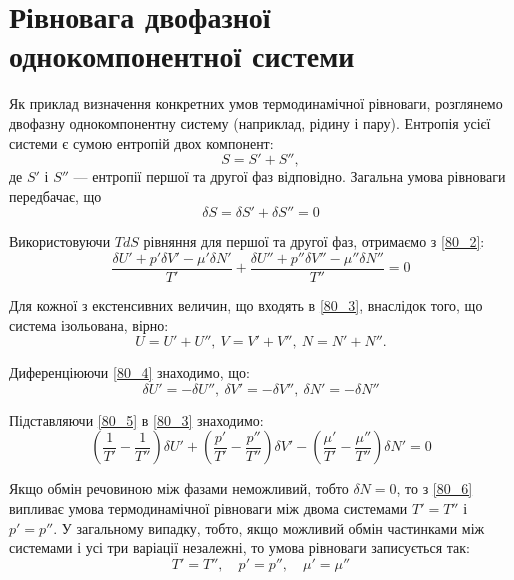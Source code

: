 \section{Рівновага двофазної однокомпонентної системи}

Як приклад визначення конкретних умов термодинамічної рівноваги, розглянемо двофазну однокомпонентну систему (наприклад, рідину і пару). Ентропія усієї системи є сумою ентропій двох компонент:
\begin{equation} \label{80_1}
S = S' + S'',
\end{equation}
%
де $S'$ і $S''$ --- ентропії першої та другої фаз відповідно. Загальна умова рівноваги передбачає, що
\begin{equation} \label{80_2}
\delta S = \delta S' + \delta S'' = 0
\end{equation}

Використовуючи $TdS$ рівняння для першої та другої фаз, отримаємо з \eqref{80_2}:
\begin{equation} \label{80_3}
\frac{\delta U' + p' \delta V' - \mu' \delta N'}{T'} + \frac{\delta U'' + p'' \delta V'' - \mu'' \delta N''}{T''} = 0
\end{equation}

Для кожної з екстенсивних величин, що входять в \eqref{80_3}, внаслідок того, що система ізольована, вірно:
\begin{equation}\label{80_4}
U = U' + U'', \
V = V' + V'', \
N = N' + N''.
\end{equation}

Диференціюючи \eqref{80_4} знаходимо, що:
\begin{equation}\label{80_5}
\delta U' = -\delta U'', \
\delta V' = -\delta V'', \
\delta N' = -\delta N''
\end{equation}

Підставляючи \eqref{80_5} в \eqref{80_3} знаходимо:
\begin{equation} \label{80_6}
\left(\frac{1}{T'} - \frac{1}{T''}\right) \delta U' + \left(\frac{p'}{T'} - \frac{p''}{T''}\right) \delta V' - \left(\frac{\mu'}{T'} - \frac{\mu''}{T''}\right) \delta N' = 0
\end{equation}

Якщо обмін речовиною між фазами неможливий, тобто $\delta N = 0$, то з \eqref{80_6} випливає умова термодинамічної рівноваги між двома системами $T' = T''$ і $p' = p''$. У загальному випадку, тобто, якщо можливий обмін частинками між системами і усі три варіації незалежні, то умова рівноваги записується так:
\begin{equation} \label{80_7}
T' = T'', \quad p' = p'', \quad \mu' = \mu''
\end{equation}

